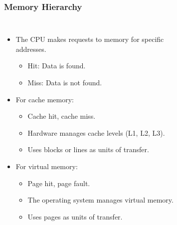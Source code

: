 \begin{frame}
    \frametitle{Memory Hierarchy}
    \begin{columns}
        \begin{itemize}
            \item The CPU makes requests to memory for specific addresses.
            \begin{itemize}
                \item Hit: Data is found.
                \item Miss: Data is not found.
            \end{itemize}
            \item For cache memory:
            \begin{itemize}
                \item Cache hit, cache miss.
                \item Hardware manages cache levels (L1, L2, L3).
                \item Uses blocks or lines as units of transfer.
            \end{itemize}
            \item For virtual memory:
            \begin{itemize}
                \item Page hit, page fault.
                \item The operating system manages virtual memory.
                \item Uses pages as units of transfer.
            \end{itemize}
        \end{itemize}

        \newsavebox{\asciimemheir}
        \begin{lrbox}{\asciimemheir}
            \begin{varwidth}{\maxdimen}
            \end{varwidth}
        \end{lrbox}%

        \begin{figure}[h]
            \centering
            \scalebox{0.7}{\usebox{\asciimemheir}}
        \end{figure}

    \end{columns}
\end{frame}

